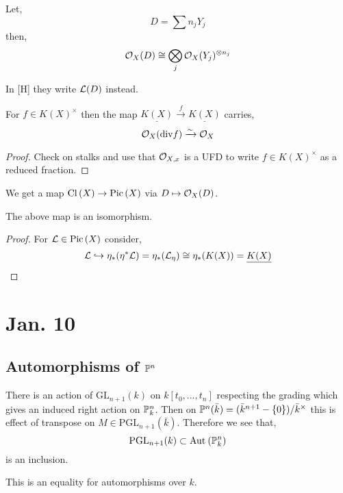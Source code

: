 \documentclass[12pt]{article}
\begin{document}
\begin{prop}
Let,
\[ D = \sum n_j Y_j \]
then,
\[ \struct{X}(D) \cong \bigotimes_j \struct{X}(Y_j)^{\otimes n_j} \]
\end{prop}

\begin{rmk}
In [H] they write $\L(D)$ instead.
\end{rmk}

\begin{lemma}
For $f \in K(X)^\times$ then the map $\underline{K(X)} \xrightarrow{f} \underline{K(X)}$ carries,
\[ \struct{X}(\div{f}) \iso \struct{X} \]
\end{lemma}

\begin{proof}
Check on stalks and use that $\stalk{X}{x}$ is a UFD to write $f \in K(X)^\times$ as a reduced fraction. 
\end{proof}

\begin{cor}
We get a map $\Cl{X} \to \Pic{X}$ via $D \mapsto \struct{X}(D)$. 
\end{cor}

\begin{prop}
The above map is an isomorphism. 
\end{prop}

\begin{proof}
For $\L \in \Pic{X}$ consider,
\[ \L \embed \eta_* (\eta^* \L) = \eta_* (\L_\eta) \cong \eta_* (K(X)) = \underline{K(X)} \]
\end{proof}

\section{Jan. 10}

\subsection{Automorphisms of $\P^n$}

\renewcommand{\GL}{\mathrm{GL}}
\renewcommand{\PGL}{\mathrm{PGL}}

There is an action of $\GL_{n+1}(k)$ on $k[t_0, \dots, t_n]$ respecting the grading which gives an induced right action on $\P^n_k$. Then on $\P^n(\bar{k}) = (\bar{k}^{n+1} - \{ 0 \})/\bar{k}^\times$ this is effect of transpose on $M \in \PGL_{n+1}(\bar{k})$. Therefore we see that,
\[ \PGL_{n+1}(k) \subset \Aut{\P^n_k} \]
is an inclusion.

\begin{prop}
This is an equality for automorphisms over $k$.
\end{prop}
\end{document}
